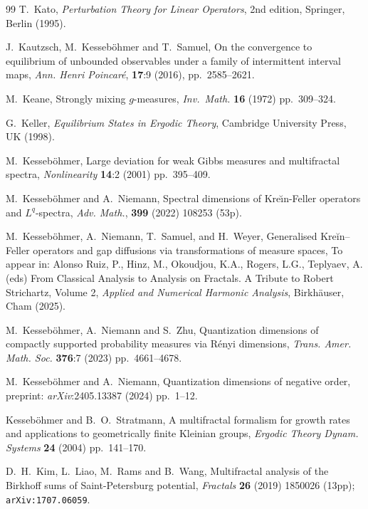 \documentclass[11pt,reqno]{amsart}
\theoremstyle{plain}
\theoremstyle{definition}
\begin{document}
\begin{thebibliography}{99}
T.~Kato,
\textit{Perturbation Theory for Linear Operators},
2nd edition, Springer, Berlin (1995).

J.~Kautzsch,  M.~Kesseb\"{o}hmer and T.~Samuel,
On the convergence to equilibrium of unbounded observables
              under a family of intermittent interval maps,
\textit{Ann. Henri Poincar\'{e}},
 \textbf{17}:9 (2016), pp.~2585--2621. 



M.~Keane,
Strongly mixing $g$-measures,
\textit{Inv.\ Math.} \textbf{16} (1972) pp.~309--324.


G.~Keller,
\textit{Equilibrium States in Ergodic Theory},
Cambridge University Press, UK (1998).





M.~Kesseb\"{o}hmer, 
Large deviation for weak {G}ibbs measures and multifractal spectra,
\textit{Nonlinearity} 
 \textbf{14}:2 (2001) pp.~395--409.



M.~Kesseb\"{o}hmer and A.~Niemann,
Spectral dimensions of {K}re\u{\i}n-{F}eller operators and $L^q$-spectra,
\textit{Adv. Math.},
\textbf{399} (2022) 108253 (53p).

M.~Kesseb\"{o}hmer, A.~Niemann, T.~Samuel, and H.~Weyer,
Generalised  Kreĭn--Feller operators and gap diffusions via transformations of measure spaces,
To appear in: Alonso Ruiz, P., Hinz, M., Okoudjou, K.A., Rogers, L.G., Teplyaev, A. (eds) From Classical Analysis to Analysis on Fractals. A Tribute to Robert Strichartz, Volume 2, \textit{Applied and Numerical Harmonic Analysis},
Birkhäuser, Cham (2025).


M.~Kesseb\"{o}hmer, A.~Niemann and S.~Zhu,
Quantization dimensions of compactly supported probability measures via {R}\'{e}nyi dimensions,
\textit{Trans. Amer. Math. Soc.}
\textbf{376}:7 (2023) pp.~4661--4678.

M.~Kesseb\"{o}hmer and A.~Niemann,
Quantization dimensions of negative order,
  preprint:  \textit{arXiv}:2405.13387  (2024) pp.~1--12.
 

Kesseb\"{o}hmer and B.~O.~Stratmann,
  A multifractal formalism for growth rates and applications to
   geometrically finite Kleinian groups,
\textit{Ergodic Theory Dynam. Systems}
\textbf{24} (2004) pp.~141--170.


D.~H.~Kim, L.~Liao, M.~Rams and B.~Wang, 
Multifractal analysis of the Birkhoff sums of Saint-Petersburg potential, 
\textit{Fractals} \textbf{26} (2019) 1850026 (13pp); 
\texttt{arXiv:1707.06059}.


\end{thebibliography}
\end{document}
